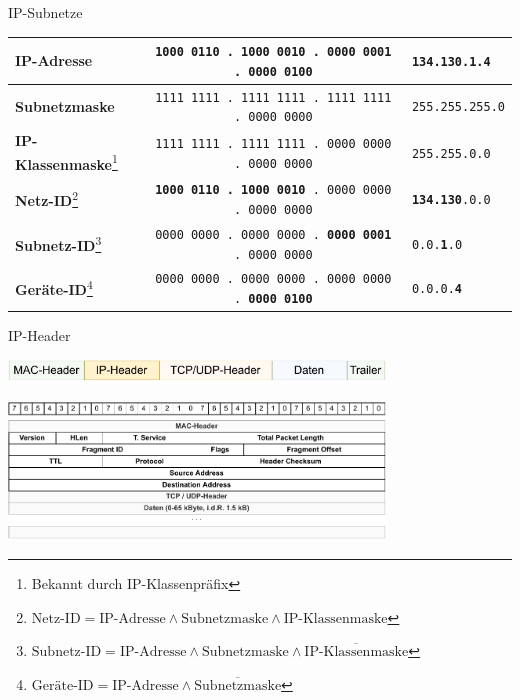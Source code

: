 \begin{example}{IP-Subnetze}
    \begin{center}
        \begin{tabular}{|l|c|l|}
            \hline
            \textbf{IP-Adresse}                                                                                                                     & \texttt{1000 0110 . 1000 0010 . 0000 0001 . 0000 0100}          & \texttt{134.130.1.4}          \\\hline
            \textbf{Subnetzmaske}                                                                                                                   & \texttt{1111 1111 . 1111 1111 . 1111 1111 . 0000 0000}          & \texttt{255.255.255.0}        \\\hline
            \textbf{IP-Klassenmaske}\footnote{Bekannt durch IP-Klassenpräfix}                                                                       & \texttt{1111 1111 . 1111 1111 . 0000 0000 . 0000 0000}          & \texttt{255.255.0.0}          \\\hline
            \textbf{Netz-ID}\footnote{$\text{Netz-ID} = \text{IP-Adresse} \land \text{Subnetzmaske} \land \text{IP-Klassenmaske}$}                  & \texttt{\textbf{1000 0110 . 1000 0010} . 0000 0000 . 0000 0000} & \texttt{\textbf{134.130}.0.0} \\\hline
            \textbf{Subnetz-ID}\footnote{$\text{Subnetz-ID} = \text{IP-Adresse} \land \text{Subnetzmaske} \land \overline{\text{IP-Klassenmaske}}$} & \texttt{0000 0000 . 0000 0000 . \textbf{0000 0001} . 0000 0000} & \texttt{0.0.\textbf{1}.0}     \\\hline
            \textbf{Geräte-ID}\footnote{$\text{Geräte-ID} = \text{IP-Adresse} \land	\overline{\text{Subnetzmaske}}$}                                 & \texttt{0000 0000 . 0000 0000 . 0000 0000 . \textbf{0000 0100}} & \texttt{0.0.0.\textbf{4}}     \\\hline
        \end{tabular}
    \end{center}
\end{example}

\begin{defi}{IP-Header}
    \begin{center}
        \includegraphics[width=0.75\textwidth]{includes/figures/defi_ip_header_kapselung.pdf}

        \includegraphics[width=0.75\textwidth]{includes/figures/defi_ip_header.pdf}
    \end{center}
\end{defi}